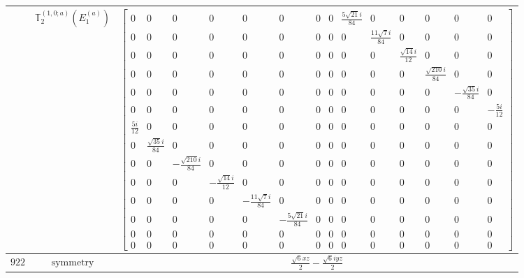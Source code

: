 \documentclass[fleqn,8pt,landscape]{jsarticle}
\begin{document}
\begin{longtable}{ccc}
$  $ & $ \mathbb{T}_{2}^{(1,0;a)}(E_{1}^{(a)}) $ & $ \begin{bmatrix} 0 & 0 & 0 & 0 & 0 & 0 & 0 & 0 & \frac{5 \sqrt{21} i}{84} & 0 & 0 & 0 & 0 & 0 \\ 0 & 0 & 0 & 0 & 0 & 0 & 0 & 0 & 0 & \frac{11 \sqrt{7} i}{84} & 0 & 0 & 0 & 0 \\ 0 & 0 & 0 & 0 & 0 & 0 & 0 & 0 & 0 & 0 & \frac{\sqrt{14} i}{12} & 0 & 0 & 0 \\ 0 & 0 & 0 & 0 & 0 & 0 & 0 & 0 & 0 & 0 & 0 & \frac{\sqrt{210} i}{84} & 0 & 0 \\ 0 & 0 & 0 & 0 & 0 & 0 & 0 & 0 & 0 & 0 & 0 & 0 & - \frac{\sqrt{35} i}{84} & 0 \\ 0 & 0 & 0 & 0 & 0 & 0 & 0 & 0 & 0 & 0 & 0 & 0 & 0 & - \frac{5 i}{12} \\ \frac{5 i}{12} & 0 & 0 & 0 & 0 & 0 & 0 & 0 & 0 & 0 & 0 & 0 & 0 & 0 \\ 0 & \frac{\sqrt{35} i}{84} & 0 & 0 & 0 & 0 & 0 & 0 & 0 & 0 & 0 & 0 & 0 & 0 \\ 0 & 0 & - \frac{\sqrt{210} i}{84} & 0 & 0 & 0 & 0 & 0 & 0 & 0 & 0 & 0 & 0 & 0 \\ 0 & 0 & 0 & - \frac{\sqrt{14} i}{12} & 0 & 0 & 0 & 0 & 0 & 0 & 0 & 0 & 0 & 0 \\ 0 & 0 & 0 & 0 & - \frac{11 \sqrt{7} i}{84} & 0 & 0 & 0 & 0 & 0 & 0 & 0 & 0 & 0 \\ 0 & 0 & 0 & 0 & 0 & - \frac{5 \sqrt{21} i}{84} & 0 & 0 & 0 & 0 & 0 & 0 & 0 & 0 \\ 0 & 0 & 0 & 0 & 0 & 0 & 0 & 0 & 0 & 0 & 0 & 0 & 0 & 0 \\ 0 & 0 & 0 & 0 & 0 & 0 & 0 & 0 & 0 & 0 & 0 & 0 & 0 & 0 \end{bmatrix} $ \\ \hline
$ 922 $ & $ \text{symmetry} $ & $ \frac{\sqrt{6} x z}{2} - \frac{\sqrt{6} i y z}{2} $ \\

\end{longtable}
\end{document}
